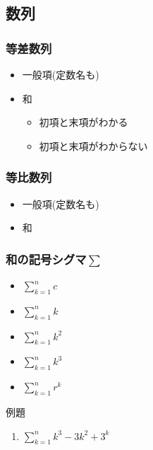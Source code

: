 \documentclass[10pt,dvipdfmx]{jsarticle}
\begin{document}
\subsection*{数列}
\subsubsection*{等差数列}
\begin{itemize}
  \item 一般項(定数名も)
  \item 和
        \begin{itemize}
          \item 初項と末項がわかる
          \item 初項と末項がわからない
        \end{itemize}
\end{itemize}
\subsubsection*{等比数列}
\begin{itemize}
  \item 一般項(定数名も)
  \item 和
\end{itemize}

\subsubsection*{和の記号シグマ$\sum$}
\begin{multicols}{2}
  \begin{large}
    \begin{itemize}
      \item $\sum_{k=1}^{n}c$
      \item $\sum_{k=1}^{n}k$
      \item $\sum_{k=1}^{n}k^2$
      \item $\sum_{k=1}^{n}k^3$
      \item $\sum_{k=1}^{n}r^k$
    \end{itemize}
  \end{large}
\end{multicols}

\begin{itembox}[l]{例題}
  \begin{large}
    \begin{enumerate}
      \item $\sum_{k=1}^{n}k^3-3k^2+3^k$
    \end{enumerate}
  \end{large}
\end{itembox}
\end{document}
